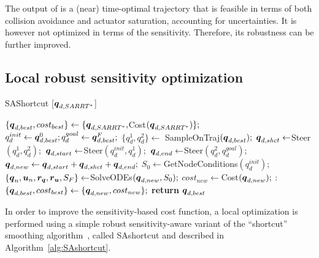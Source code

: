 The output of  is a (near) time-optimal trajectory that is feasible in terms of both collision avoidance and actuator saturation, accounting for uncertainties.
It is however not optimized in terms of the sensitivity. 
Therefore, its robustness can be further improved.

\subsection{Local robust sensitivity optimization}

\begin{algorithm}[htp]
    \caption{SAShortcut [$\boldsymbol{q}_{d,SARRT^*}$]}\label{alg:SAshortcut}
    \begin{algorithmic}[1]
        \State $\{\boldsymbol{q}_{d,best}, cost_{best}\} \gets \{\boldsymbol{q}_{d,SARRT^*}, $Cost$(\boldsymbol{q}_{d,SARRT^*}) \};$
        \State $q_d^{init} \gets \boldsymbol{q}_{d,best}^0; q_d^{goal} \gets \boldsymbol{q}_{d,best}^F;$
            \State $\{q_d^{1}, q_d^{2}\} \gets$ SampleOnTraj$(\boldsymbol{q}_{d,best});$
            \State $\boldsymbol{q}_{d,shct} \gets $Steer$(q_d^{1}, q_d^{2});$
                \State $\boldsymbol{q}_{d,start} \gets $Steer$(q_d^{init}, q_d^{1});$
                \State $\boldsymbol{q}_{d,end} \gets $Steer$(q_d^{2}, q_d^{goal});$
                \State $\boldsymbol{q}_{d,new} \gets \boldsymbol{q}_{d,start}+\boldsymbol{q}_{d,shct}+\boldsymbol{q}_{d,end};$
                \State $S_0 \gets $GetNodeConditions$(q_d^{init});$
                \State $\{\boldsymbol{q}_n, \boldsymbol{u}_n, \boldsymbol{r_q}, \boldsymbol{r_u}, S_F\}  \gets $SolveODEs$(\boldsymbol{q}_{d,new}, S_0);$
                \State $cost_{new} \gets $Cost$(\boldsymbol{q}_{d,new});$
                :   
                        \State $\{\boldsymbol{q}_{d,best}, cost_{best}\} \gets \{\boldsymbol{q}_{d,new}, cost_{new}\};$
                    \EndIf
                \EndIf
            \EndIf
        \EndWhile
    \State \textbf{return} $\boldsymbol{q}_{d,best}$
    \end{algorithmic}
\end{algorithm}

In order to improve the sensitivity-based cost function, a local optimization is performed using a simple robust sensitivity-aware variant of the ``shortcut'' smoothing algorithm~\cite{cShortcut}, called \gls{SAshortcut} and described in Algorithm~\ref{alg:SAshortcut}. 

